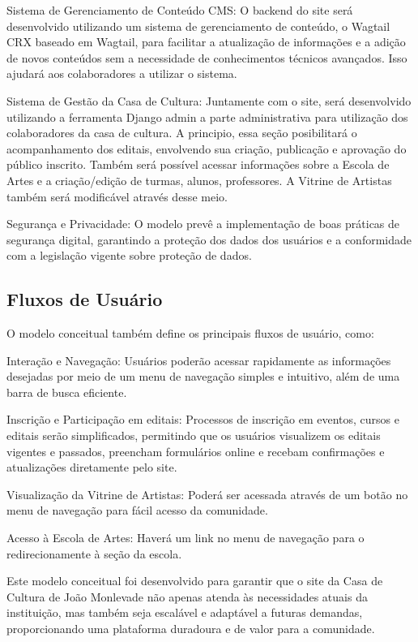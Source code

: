 Sistema de Gerenciamento de Conteúdo \ac{CMS}: O backend do site será desenvolvido utilizando um sistema de gerenciamento de conteúdo, o Wagtail CRX baseado em Wagtail, para facilitar a atualização de informações e a adição de novos conteúdos sem a necessidade de conhecimentos técnicos avançados. Isso ajudará aos colaboradores a utilizar o sistema.

Sistema de Gestão da Casa de Cultura: Juntamente com o site, será desenvolvido utilizando a ferramenta Django admin a parte administrativa para utilização dos colaboradores da casa de cultura. A principio, essa seção posibilitará o acompanhamento dos editais, envolvendo sua criação, publicação e aprovação do público inscrito. Também será possível acessar informações sobre a Escola de Artes e a criação/edição de turmas, alunos, professores. A Vitrine de Artistas também será modificável através desse meio.

Segurança e Privacidade: O modelo prevê a implementação de boas práticas de segurança digital, garantindo a proteção dos dados dos usuários e a conformidade com a legislação vigente sobre proteção de dados.

\subsection{Fluxos de Usuário}

O modelo conceitual também define os principais fluxos de usuário, como:

Interação e Navegação: Usuários poderão acessar rapidamente as informações desejadas por meio de um menu de navegação simples e intuitivo, além de uma barra de busca eficiente.

Inscrição e Participação em editais: Processos de inscrição em eventos, cursos e editais serão simplificados, permitindo que os usuários visualizem os editais vigentes e passados, preencham formulários online e recebam confirmações e atualizações diretamente pelo site.

Visualização da Vitrine de Artistas: Poderá ser acessada através de um botão no menu de navegação para fácil acesso da comunidade.

Acesso à Escola de Artes: Haverá um link no menu de navegação para o redirecionamente à seção da escola.

Este modelo conceitual foi desenvolvido para garantir que o site da Casa de Cultura de João Monlevade não apenas atenda às necessidades atuais da instituição, mas também seja escalável e adaptável a futuras demandas, proporcionando uma plataforma duradoura e de valor para a comunidade.

